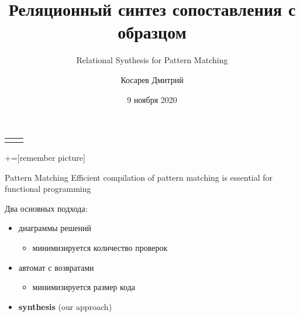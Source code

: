 \documentclass[aspectratio=169
  , xcolor={svgnames}
  , hyperref={ colorlinks,citecolor=Blue
             , linkcolor=DarkRed,urlcolor=DarkBlue}
  , russian
  ]{beamer}
\title{Реляционный синтез сопоставления с образцом}
\subtitle{Relational Synthesis for Pattern Matching}
\date{9 ноября 2020}
\author{Косарев Дмитрий}
\institute[]{\normalfont
Будет опубликовано на \\
Asian Symposium on Programming Languages and Systems (APLAS) 2020
 }
\begin{document}
{
\begin{frame}[fragile]
  \begin{tabular}{p{5.5cm} p{5.5cm}}
   \begin{center}
    \end{center}
    &
    \begin{center}
    \end{center}
  \end{tabular}
  \titlepage
\end{frame}
}


+=[remember picture] 

\everymath{\displaystyle}
\begin{frame}{Pattern Matching}
Efficient compilation of pattern matching is essential for functional programming
\vspace{1cm}


Два основных подхода:
\begin{itemize}
\item диаграммы решений
\begin{itemize}
\item минимизируется количество проверок
\end{itemize}
\item автомат с возвратами
\begin{itemize}
\item минимизируется размер кода
\end{itemize}%
\item \textbf{synthesis} (our approach)
\end{itemize}

\end{frame}
\end{document}
